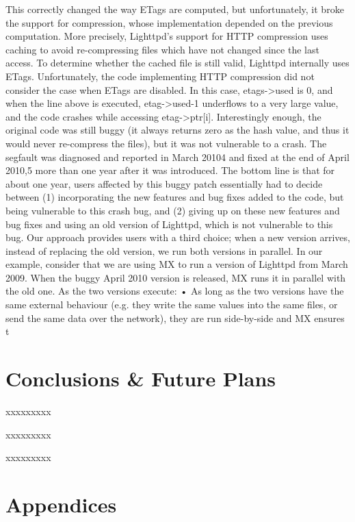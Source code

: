 \documentclass[a4paper,11pt,twoside]{report}
\begin{document}
{This correctly changed the way ETags are computed, but
unfortunately, it broke the support for compression, whose
implementation depended on the previous computation. More
precisely, Lighttpd’s support for HTTP compression uses
caching to avoid re-compressing files which have not changed
since the last access. To determine whether the cached file
is still valid, Lighttpd internally uses ETags. Unfortunately,
the code implementing HTTP compression did not consider
the case when ETags are disabled. In this case, etags->used
is 0, and when the line above is executed, etag->used-1
underflows to a very large value, and the code crashes while
accessing etag->ptr[i]. Interestingly enough, the original
code was still buggy (it always returns zero as the hash value,
and thus it would never re-compress the files), but it was not
vulnerable to a crash.
The segfault was diagnosed and reported in March 20104
and
fixed at the end of April 2010,5 more than one year after it was
introduced. The bottom line is that for about one year, users
affected by this buggy patch essentially had to decide between
(1) incorporating the new features and bug fixes added to the
code, but being vulnerable to this crash bug, and (2) giving up
on these new features and bug fixes and using an old version
of Lighttpd, which is not vulnerable to this bug.
Our approach provides users with a third choice; when a
new version arrives, instead of replacing the old version, we
run both versions in parallel. In our example, consider that we
are using MX to run a version of Lighttpd from March 2009.
When the buggy April 2010 version is released, MX runs it in
parallel with the old one. As the two versions execute:
• As long as the two versions have the same external
behaviour (e.g. they write the same values into the same
files, or send the same data over the network), they are
run side-by-side and MX ensures t}

\clearpage



\chapter{Conclusions \& Future Plans}
xxxxxxxxx\bigskip

xxxxxxxxx\bigskip

xxxxxxxxx\bigskip


\clearpage

\chapter{Appendices}
\end{document}
